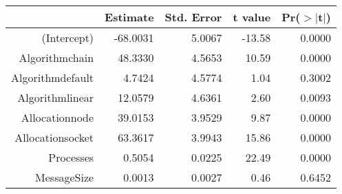 \begin{tabular}{rrrrr}
  \hline
 & Estimate & Std. Error & t value & Pr($>$$|$t$|$) \\ 
  \hline
(Intercept) & -68.0031 & 5.0067 & -13.58 & 0.0000 \\ 
  Algorithmchain & 48.3330 & 4.5653 & 10.59 & 0.0000 \\ 
  Algorithmdefault & 4.7424 & 4.5774 & 1.04 & 0.3002 \\ 
  Algorithmlinear & 12.0579 & 4.6361 & 2.60 & 0.0093 \\ 
  Allocationnode & 39.0153 & 3.9529 & 9.87 & 0.0000 \\ 
  Allocationsocket & 63.3617 & 3.9943 & 15.86 & 0.0000 \\ 
  Processes & 0.5054 & 0.0225 & 22.49 & 0.0000 \\ 
  MessageSize & 0.0013 & 0.0027 & 0.46 & 0.6452 \\ 
   \hline
\end{tabular}
